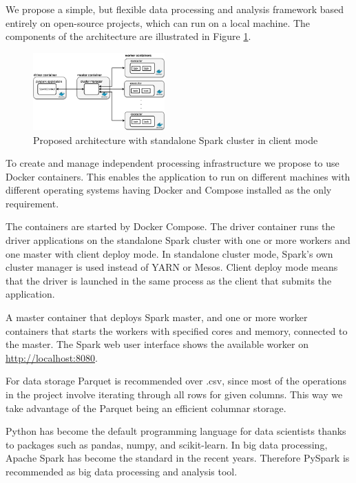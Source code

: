 We propose a simple, but flexible data processing and analysis framework based entirely on open-source projects, which can run on a local machine. The components of the architecture are illustrated in Figure \ref{fig:architecture}. 

\begin{figure}[h]
    \includegraphics[width=0.45\textwidth]{images/architecture.png}
    \caption{Proposed architecture with standalone Spark cluster in client mode}
    \label{fig:architecture}
\end{figure}

To create and manage independent processing infrastructure we propose to use Docker containers. This enables the application to run on different machines with different operating systems having Docker and Compose installed as the only requirement. 

The containers are started by Docker Compose. The driver container runs the driver applications on the standalone Spark cluster with one or more workers and one master with client deploy mode. In standalone cluster mode, Spark's own cluster manager is used instead of YARN or Mesos. Client deploy mode means that  the driver is launched in the same process as the client that submits the application. 

A master container that deploys Spark master, and one or more worker containers that starts the workers with specified cores and memory, connected to the master. The Spark web user interface shows the available worker on \url{http://localhost:8080}.

For data storage Parquet is recommended over .csv, since most of the operations in the project involve iterating through all rows for given columns. This way we take advantage of the Parquet being an efficient columnar storage. 

Python has become the default programming language for data scientists thanks to packages such as pandas, numpy, and scikit-learn. In big data processing, Apache Spark has become the standard in the recent years. Therefore PySpark is recommended as big data processing and analysis tool.

